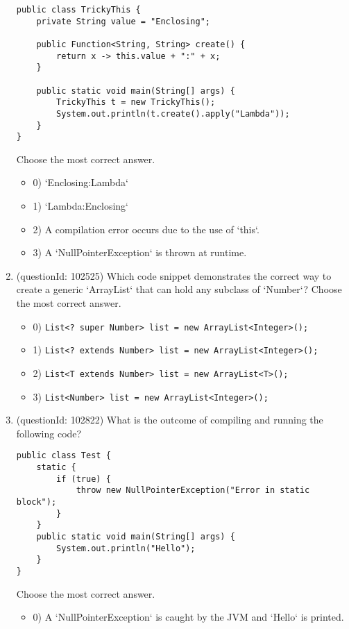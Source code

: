 \documentclass[12pt]{article}
\begin{document}
\begin{enumerate}[label=(\arabic*)]
\begin{verbatim}
public class TrickyThis {
    private String value = "Enclosing";

    public Function<String, String> create() {
        return x -> this.value + ":" + x;
    }

    public static void main(String[] args) {
        TrickyThis t = new TrickyThis();
        System.out.println(t.create().apply("Lambda"));
    }
}
\end{verbatim}
Choose the most correct answer. 
\begin{itemize}
\item 0) `Enclosing:Lambda`

\item 1) `Lambda:Enclosing`

\item 2) A compilation error occurs due to the use of `this`.

\item 3) A `NullPointerException` is thrown at runtime.

\end{itemize}
\item (questionId: 102525) Which code snippet demonstrates the correct way to create a generic `ArrayList` that can hold any subclass of `Number`?
Choose the most correct answer. 
\begin{itemize}
\item 0) \verb|List<? super Number> list = new ArrayList<Integer>();|

\item 1) \verb|List<? extends Number> list = new ArrayList<Integer>();|

\item 2) \verb|List<T extends Number> list = new ArrayList<T>();|

\item 3) \verb|List<Number> list = new ArrayList<Integer>();|

\end{itemize}
\item (questionId: 102822) What is the outcome of compiling and running the following code?
\begin{verbatim}
public class Test {
    static {
        if (true) {
            throw new NullPointerException("Error in static block");
        }
    }
    public static void main(String[] args) {
        System.out.println("Hello");
    }
}
\end{verbatim}
Choose the most correct answer. 
\begin{itemize}
\item 0) A `NullPointerException` is caught by the JVM and `Hello` is printed.


\end{itemize}
\end{enumerate}
\end{document}
